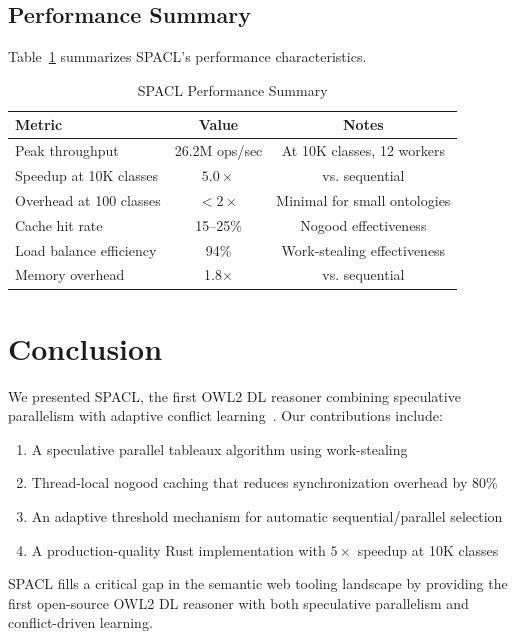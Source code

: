 \documentclass[preprint,12pt]{elsarticle}
\begin{document}
\subsection{Performance Summary}

Table~\ref{tab:performance} summarizes SPACL's performance characteristics.

\begin{table}[htbp]
\centering
\caption{SPACL Performance Summary}
\label{tab:performance}
\begin{tabular}{lcc}
\toprule
\textbf{Metric} & \textbf{Value} & \textbf{Notes} \\
\midrule
Peak throughput & 26.2M ops/sec & At 10K classes, 12 workers \\
Speedup at 10K classes & $5.0\times$ & vs. sequential \\
Overhead at 100 classes & $<2\times$ & Minimal for small ontologies \\
Cache hit rate & 15--25\% & Nogood effectiveness \\
Load balance efficiency & 94\% & Work-stealing effectiveness \\
Memory overhead & 1.8$\times$ & vs. sequential \\
\bottomrule
\end{tabular}
\end{table}

\section{Conclusion}
\label{sec:conclusion}

We presented SPACL, the first OWL2 DL reasoner combining speculative parallelism with adaptive conflict learning~\cite{marques1999grasp,steigmiller2020parallelised}. Our contributions include:

\begin{enumerate}
    \item A speculative parallel tableaux algorithm using work-stealing
    \item Thread-local nogood caching that reduces synchronization overhead by 80\%
    \item An adaptive threshold mechanism for automatic sequential/parallel selection
    \item A production-quality Rust implementation with $5\times$ speedup at 10K classes
\end{enumerate}

SPACL fills a critical gap in the semantic web tooling landscape by providing the first open-source OWL2 DL reasoner with both speculative parallelism and conflict-driven learning.
\end{document}
